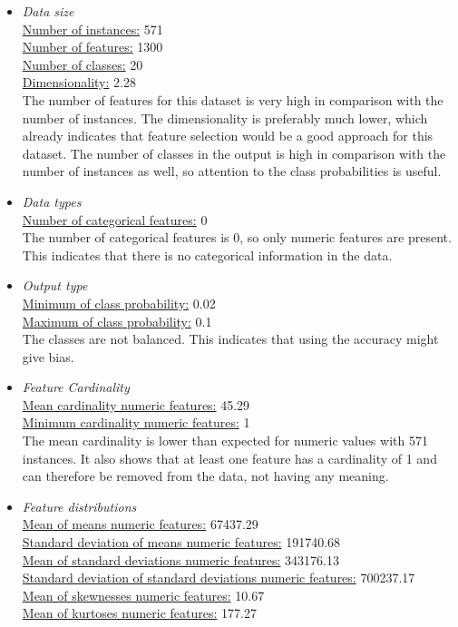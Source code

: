 \documentclass[10pt,a4paper]{report}
\begin{document}
	\begin{itemize}
		\item \textit{Data size} \\
		\underline{Number of instances:} 571 \\
		\underline{Number of features:} 1300 \\
		\underline{Number of classes:} 20 \\
		\underline{Dimensionality:} 2.28 \\
		
		The number of features for this dataset is very high in comparison with the number of instances. The dimensionality is preferably much lower, which already indicates that feature selection would be a good approach for this dataset. The number of classes in the output is high in comparison with the number of instances as well, so attention to the class probabilities is useful.
		
		\item \textit{Data types} \\
		\underline{Number of categorical features:} 0 \\
		
		The number of categorical features is 0, so only numeric features are present. This indicates that there is no categorical information in the data.
		
		\item \textit{Output type} \\
		\underline{Minimum of class probability:} 0.02 \\
		\underline{Maximum of class probability:} 0.1 \\
		
		The classes are not balanced. This indicates that using the accuracy might give bias.
		
		\item \textit{Feature Cardinality} \\
		\underline{Mean cardinality numeric features:} 45.29 \\
		\underline{Minimum cardinality numeric features:} 1 \\
		
		The mean cardinality is lower than expected for numeric values with 571 instances. It also shows that at least one feature has a cardinality of 1 and can therefore be removed from the data, not having any meaning.
		
		\item \textit{Feature distributions} \\
		\underline{Mean of means numeric features:} 67437.29 \\
		\underline{Standard deviation of means numeric features:} 191740.68 \\
		\underline{Mean of standard deviations numeric features:} 343176.13 \\
		\underline{Standard deviation of standard deviations numeric features:} 700237.17 \\
		\underline{Mean of skewnesses numeric features:} 10.67 \\
		\underline{Mean of kurtoses numeric features:} 177.27 \\
		

\end{itemize}
\end{document}

